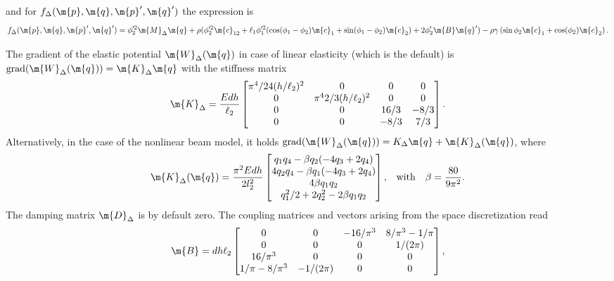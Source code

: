 %
and for $f_{\Delta}(\m{p}, \m{q}, \m{p}^\prime, \m{q}^\prime)$ the expression is
%
\begin{equation*}
  f_{\Delta}(\m{p}, \m{q}, \m{p}^\prime, \m{q}^\prime) = \phi_2^{\prime2} \m{M}_{\Delta} \m{q}+\rho(\phi_2^{\prime2} \m{c}_{12}+\ell_1 \phi_1^{\prime2}(\cos(\phi_1 - \phi_2) \m{c}_1 + \sin(\phi_1 - \phi_2) \m{c}_2)+2 \phi_2^\prime \m{B} \m{q}^\prime)-\rho \gamma\left(\sin \phi_2 \m{c}_1+\cos(\phi_2) \m{c}_2\right) \text{.}
\end{equation*}

The gradient of the elastic potential $\m{W}_{\Delta}(\m{q})$ in case of linear elasticity (which is the default) is $\mathrm{grad}(\m{W}_{\Delta}(\m{q})) = \m{K}_{\Delta} \m{q}$ with the stiffness matrix
%
\begin{equation*}
  \m{K}_{\Delta} = \dfrac{E d h}{\ell_2} \begin{bmatrix}
    \pi^4/24(h/\ell_2)^2 & 0                    & 0    & 0    \\
    0                   & \pi^4 2/3(h/\ell_2)^2 & 0    & 0    \\
    0                   & 0                     & 16/3 & -8/3 \\
    0                   & 0                     & -8/3 & 7/3
  \end{bmatrix} \text{.}
\end{equation*}
%
Alternatively, in the case of the nonlinear beam model, it holds $\mathrm{grad}(\m{W}_{\Delta}(\m{q})) = K_{\Delta}\m{q} + \m{K}_{\Delta}(\m{q})$, where
%
\begin{equation*}
  \m{K}_{\Delta}(\m{q}) = \dfrac{\pi^2 E d h}{2l_2^2} \begin{bmatrix}
    q_1 q_4 - \beta q_2(-4q_3 + 2q_4) \\
    4 q_2 q_4 - \beta q_1(-4q_3 + 2q_4) \\
    4 \beta q_1 q_2 \\
    q_1^2/2 + 2q_2^2 - 2 \beta q_1 q_2
  \end{bmatrix} \text{,}
  \quad \text{with} \quad
  \beta = \dfrac{80}{9\pi^2} \text{.}
\end{equation*}
%
The damping matrix $\m{D}_{\Delta}$ is by default zero. The coupling matrices and vectors arising from the space discretization read
%
\begin{equation*}
  \m{B} = d h \ell_2 \begin{bmatrix}
    0             & 0         & -16/\pi^3 & 8/\pi^3-1/\pi \\
    0             & 0         & 0         & 1/(2\pi)      \\
    16/\pi^3      & 0         & 0         & 0             \\
    1/\pi-8/\pi^3 & -1/(2\pi) & 0         & 0
  \end{bmatrix} \text{,}
\end{equation*}
